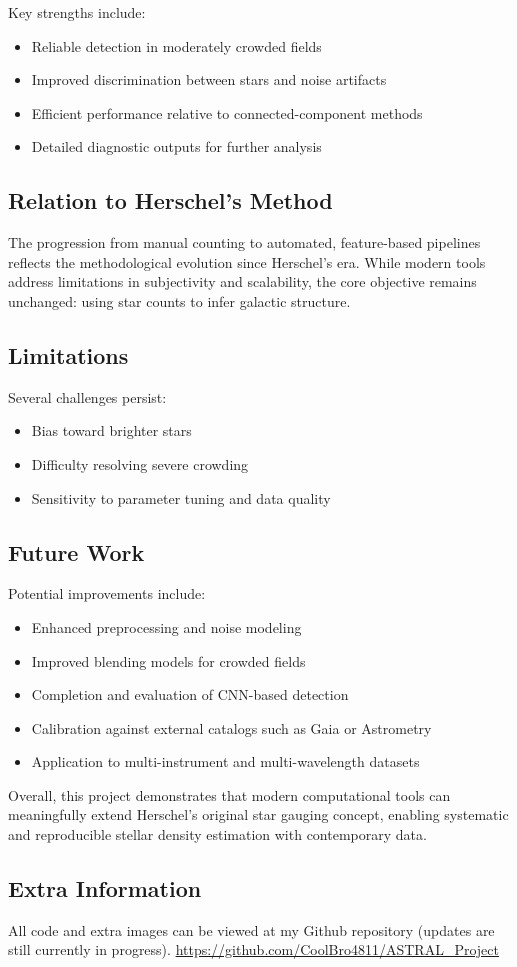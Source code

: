 \documentclass[12pt]{article}
\begin{document}
Key strengths include:
\begin{itemize}
    \item Reliable detection in moderately crowded fields
    \item Improved discrimination between stars and noise artifacts
    \item Efficient performance relative to connected-component methods
    \item Detailed diagnostic outputs for further analysis
\end{itemize}

\subsection{Relation to Herschel's Method}
The progression from manual counting to automated, feature-based pipelines reflects the methodological evolution since Herschel’s era. While modern tools address limitations in subjectivity and scalability, the core objective remains unchanged: using star counts to infer galactic structure.

\subsection{Limitations}
Several challenges persist:
\begin{itemize}
    \item Bias toward brighter stars
    \item Difficulty resolving severe crowding
    \item Sensitivity to parameter tuning and data quality
\end{itemize}

\subsection{Future Work}
Potential improvements include:
\begin{itemize}
    \item Enhanced preprocessing and noise modeling
    \item Improved blending models for crowded fields
    \item Completion and evaluation of CNN-based detection
    \item Calibration against external catalogs such as Gaia or Astrometry
    \item Application to multi-instrument and multi-wavelength datasets
\end{itemize}

Overall, this project demonstrates that modern computational tools can meaningfully extend Herschel’s original star gauging concept, enabling systematic and reproducible stellar density estimation with contemporary data.

\subsection{Extra Information}

All code and extra images can be viewed at my Github repository (updates are still currently in progress).
\url{https://github.com/CoolBro4811/ASTRAL_Project}
\end{document}
